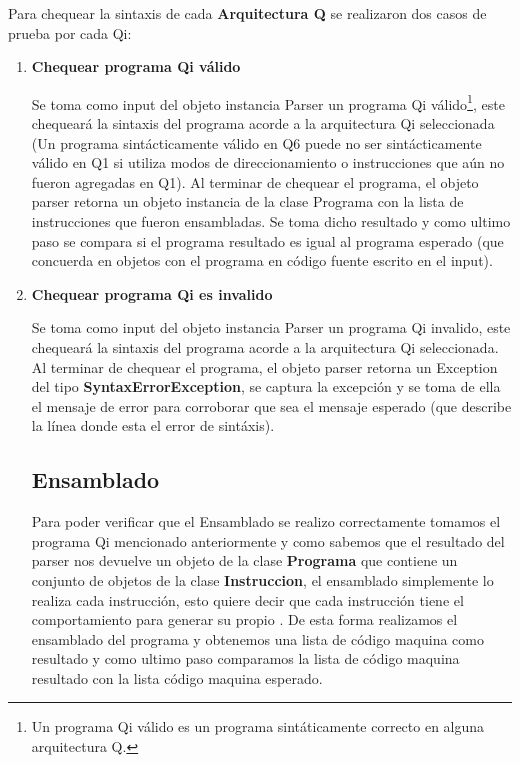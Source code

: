 Para chequear la sintaxis de cada \textbf{Arquitectura Q} se realizaron dos casos de prueba por cada Qi:
\begin{enumerate}
\item \textbf{Chequear programa Qi válido}

Se toma como input del objeto instancia Parser un programa Qi válido\footnote{Un programa Qi válido es un programa sintáticamente correcto en alguna arquitectura Q.}, este chequeará la sintaxis del programa acorde a la arquitectura Qi seleccionada (Un programa sintácticamente válido en Q6 puede no ser sintácticamente válido en Q1 si utiliza modos de direccionamiento o instrucciones que aún no fueron agregadas en Q1). Al terminar de chequear el programa, el objeto parser retorna un objeto instancia de la clase Programa con la lista de instrucciones que fueron ensambladas. 
Se toma dicho resultado y como ultimo paso se compara si el programa resultado es igual al programa esperado (que concuerda en objetos con el programa en código fuente escrito en el input).


\item \textbf{Chequear programa Qi es invalido} 

Se toma como input del objeto instancia Parser un programa Qi invalido, este chequeará la sintaxis del programa acorde a la arquitectura Qi seleccionada. Al terminar de chequear el programa, el objeto parser retorna un Exception del tipo \textbf{SyntaxErrorException}, se captura la excepción y se toma de ella el mensaje de error para corroborar que sea el mensaje esperado (que describe la línea donde esta el error de sintáxis).


\subsection{Ensamblado}
Para poder verificar que el Ensamblado se realizo correctamente tomamos el programa Qi mencionado anteriormente y como sabemos que el resultado del parser nos devuelve un objeto de la clase \textbf{Programa} que contiene un conjunto de objetos de la clase \textbf{Instruccion}, el ensamblado simplemente lo realiza cada instrucción, esto quiere decir que cada instrucción tiene el comportamiento para generar su propio \codmaq. De esta forma realizamos el ensamblado del programa y obtenemos una lista de código maquina como resultado y como ultimo paso comparamos la lista de código maquina resultado con la lista código maquina esperado.


\end{enumerate}
